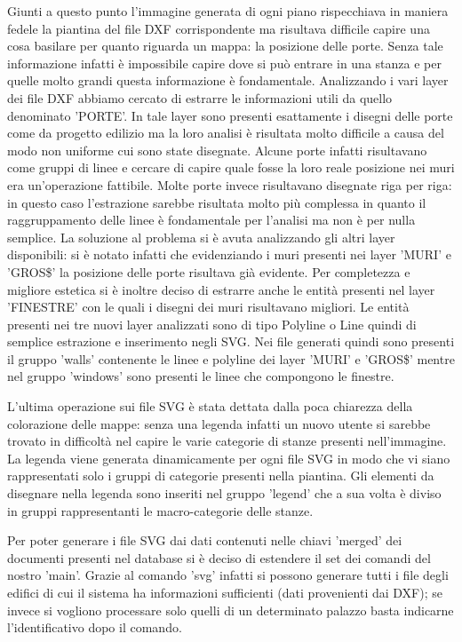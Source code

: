 \documentclass[12pt]{report}
\begin{document}
Giunti a questo punto l'immagine generata di ogni piano rispecchiava in maniera fedele la piantina del file DXF corrispondente ma risultava difficile capire una cosa basilare per quanto riguarda un mappa: la posizione delle porte.
Senza tale informazione infatti è impossibile capire dove si può entrare in una stanza e per quelle molto grandi questa informazione è fondamentale.
Analizzando i vari layer dei file DXF abbiamo cercato di estrarre le informazioni utili da quello denominato 'PORTE'.
In tale layer sono presenti esattamente i disegni delle porte come da progetto edilizio ma la loro analisi è risultata molto difficile a causa del modo non uniforme cui sono state disegnate.
Alcune porte infatti risultavano come gruppi di linee e cercare di capire quale fosse la loro reale posizione nei muri era un'operazione fattibile.
Molte porte invece risultavano disegnate riga per riga: in questo caso l'estrazione sarebbe risultata molto più complessa in quanto il raggruppamento delle linee è fondamentale per l'analisi ma non è per nulla semplice.
La soluzione al problema si è avuta analizzando gli altri layer disponibili: si è notato infatti che evidenziando i muri presenti nei layer 'MURI' e 'GROS\$' la posizione delle porte risultava già evidente.
Per completezza e migliore estetica si è inoltre deciso di estrarre anche le entità presenti nel layer 'FINESTRE' con le quali i disegni dei muri risultavano migliori.
Le entità presenti nei tre nuovi layer analizzati sono di tipo Polyline o Line quindi di semplice estrazione e inserimento negli SVG.
Nei file generati quindi sono presenti il gruppo 'walls' contenente le linee e polyline dei layer 'MURI' e 'GROS\$' mentre nel gruppo 'windows' sono presenti le linee che compongono le finestre.

L'ultima operazione sui file SVG è stata dettata dalla poca chiarezza della colorazione delle mappe: senza una legenda infatti un nuovo utente si sarebbe trovato in difficoltà nel capire le varie categorie di stanze presenti nell'immagine.
La legenda viene generata dinamicamente per ogni file SVG in modo che vi siano rappresentati solo i gruppi di categorie presenti nella piantina.   
Gli elementi da disegnare nella legenda sono inseriti nel gruppo 'legend' che a sua volta è diviso in gruppi rappresentanti le macro-categorie delle stanze.

\vspace{5mm} %

Per poter generare i file SVG dai dati contenuti nelle chiavi 'merged' dei documenti presenti nel database si è deciso di estendere il set dei comandi del nostro 'main'.
Grazie al comando 'svg' infatti si possono generare tutti i file degli edifici di cui il sistema ha informazioni sufficienti (dati provenienti dai DXF); se invece si vogliono processare solo quelli di un determinato palazzo basta indicarne l'identificativo dopo il comando.
\end{document}

